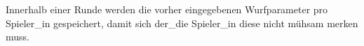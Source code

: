 Innerhalb einer Runde werden die vorher eingegebenen Wurfparameter pro Spieler\_in gespeichert, damit sich
der\_die Spieler\_in diese nicht mühsam merken muss.